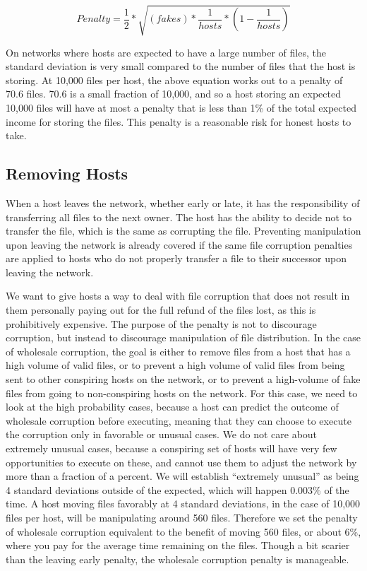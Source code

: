 \documentclass[twocolumn]{article}
\begin{document}
\begin{equation}
Penalty = \frac{1}{2} * \sqrt{(fakes) * \frac{1}{hosts} * (1 - \frac{1}{hosts})}
\end{equation}

On networks where hosts are expected to have a large number of files, the standard deviation is very small compared to the number of files that the host is storing.
At 10,000 files per host, the above equation works out to a penalty of 70.6 files.
70.6 is a small fraction of 10,000, and so a host storing an expected 10,000 files will have at most a penalty that is less than 1\% of the total expected income for storing the files.
This penalty is a reasonable risk for honest hosts to take.

\subsection{Removing Hosts}
When a host leaves the network, whether early or late, it has the responsibility of transferring all files to the next owner.
The host has the ability to decide not to transfer the file, which is the same as corrupting the file.
Preventing manipulation upon leaving the network is already covered if the same file corruption penalties are applied to hosts who do not properly transfer a file to their successor upon leaving the network.

We want to give hosts a way to deal with file corruption that does not result in them personally paying out for the full refund of the files lost, as this is prohibitively expensive.
The purpose of the penalty is not to discourage corruption, but instead to discourage manipulation of file distribution.
In the case of wholesale corruption, the goal is either to remove files from a host that has a high volume of valid files, or to prevent a high volume of valid files from being sent to other conspiring hosts on the network, or to prevent a high-volume of fake files from going to non-conspiring hosts on the network.
For this case, we need to look at the high probability cases, because a host can predict the outcome of wholesale corruption before executing, meaning that they can choose to execute the corruption only in favorable or unusual cases.
We do not care about extremely unusual cases, because a conspiring set of hosts will have very few opportunities to execute on these, and cannot use them to adjust the network by more than a fraction of a percent.
We will establish ``extremely unusual'' as being 4 standard deviations outside of the expected, which will happen 0.003\% of the time.
A host moving files favorably at 4 standard deviations, in the case of 10,000 files per host, will be manipulating around 560 files.
Therefore we set the penalty of wholesale corruption equivalent to the benefit of moving 560 files, or about 6\%, where you pay for the average time remaining on the files.
Though a bit scarier than the leaving early penalty, the wholesale corruption penalty is manageable.
\end{document}
